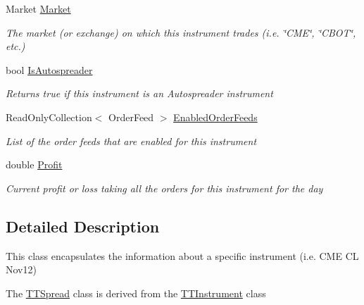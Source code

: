 \begin{DoxyCompactItemize}
Market \hyperlink{class_e_z_a_p_i_1_1_containers_1_1_t_t_instrument_ae5e1c0d3b9311d138ddaf2c1836ea1b6}{Market}
\begin{DoxyCompactList}\small\item\em The market (or exchange) on which this instrument trades (i.\-e. \char`\"{}\-C\-M\-E\char`\"{}, \char`\"{}\-C\-B\-O\-T\char`\"{}, etc.) \end{DoxyCompactList}\item 
bool \hyperlink{class_e_z_a_p_i_1_1_containers_1_1_t_t_instrument_a150c99e13c8550c1de7d514af1a63e44}{Is\-Autospreader}
\begin{DoxyCompactList}\small\item\em Returns true if this instrument is an Autospreader instrument \end{DoxyCompactList}\item 
Read\-Only\-Collection$<$ Order\-Feed $>$ \hyperlink{class_e_z_a_p_i_1_1_containers_1_1_t_t_instrument_a70e0fc1c7ca400db941b75677a10b23f}{Enabled\-Order\-Feeds}
\begin{DoxyCompactList}\small\item\em List of the order feeds that are enabled for this instrument \end{DoxyCompactList}\item 
double \hyperlink{class_e_z_a_p_i_1_1_containers_1_1_t_t_instrument_a2a905bc8d6ead9617491c49c1c86aa10}{Profit}
\begin{DoxyCompactList}\small\item\em Current profit or loss taking all the orders for this instrument for the day \end{DoxyCompactList}\end{DoxyCompactItemize}


\subsection{Detailed Description}
This class encapsulates the information about a specific instrument (i.\-e. C\-M\-E C\-L Nov12) 

The \hyperlink{class_e_z_a_p_i_1_1_containers_1_1_t_t_spread}{T\-T\-Spread} class is derived from the \hyperlink{class_e_z_a_p_i_1_1_containers_1_1_t_t_instrument}{T\-T\-Instrument} class

